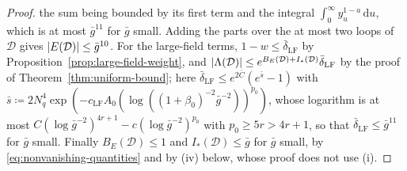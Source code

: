 \documentclass[11pt]{preprint}
\newcommand{\dd}{\mathrm{d}}
\DeclarePairedDelimiter{\abs}{\lvert}{\rvert}
\numberwithin{equation}{section}
\theoremstyle{definition}
\theoremstyle{remark}
\theoremstyle{plain}
\begin{document}
\begin{proof}
the sum being bounded by its first term and the integral $\int_0^\infty y_u^{1-a}\,\dd u$, which is at most $\bar g^{11}$ for $\bar g$ small. Adding the parts over the at most two loops of $\mathcal D$ gives $\abs{E(\mathcal D)} \leq \bar g^{10}$. For the large-field terms, $1 - w \leq \bar\delta_{\mathrm{LF}}$ by Proposition~\ref{prop:large-field-weight}, and $\abs{\Lambda(\mathcal D)} \leq e^{B_E(\mathcal D) + I_*(\mathcal D)}\bar\delta_{\mathrm{LF}}$ by the proof of Theorem~\ref{thm:uniform-bound}; here $\bar\delta_{\mathrm{LF}} \leq e^{2\bar C}(e^{\bar s} - 1)$ with $\bar s \coloneqq 2N_q^4\exp(-c_{\mathrm{LF}}A_0(\log((1 + \beta_0)^{-2}\bar g^{-2}))^{p_0})$, whose logarithm is at most $C(\log\bar g^{-2})^{4r+1} - c(\log\bar g^{-2})^{p_0}$ with $p_0 \geq 5r > 4r + 1$, so that $\bar\delta_{\mathrm{LF}} \leq \bar g^{11}$ for $\bar g$ small. Finally $B_E(\mathcal D) \leq 1$ and $I_*(\mathcal D) \leq \bar g$ for $\bar g$ small, by \eqref{eq:nonvanishing-quantities} and by (iv) below, whose proof does not use (i).


\end{proof}
\end{document}
